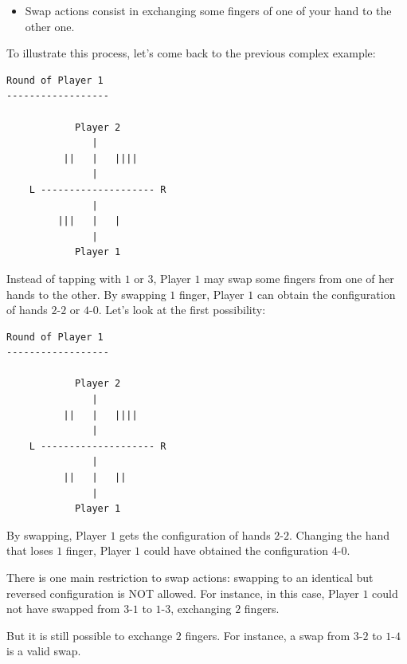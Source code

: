 \documentclass{article}
\begin{document}

\begin{itemize}
    \item Swap actions consist in exchanging some fingers of one of your hand to the other one.
\end{itemize}{}

To illustrate this process, let's come back to the previous complex example:

\begin{verbatim}
Round of Player 1
------------------

            Player 2                
               |                    
          ||   |   ||||             
               |                    
    L -------------------- R        
               |                    
         |||   |   |                
               |                    
            Player 1                

\end{verbatim}{}

Instead of tapping with $1$ or $3$, Player $1$ may swap some fingers from one of her hands to the other. By swapping $1$ finger, Player $1$ can obtain the configuration of hands $2$-$2$ or $4$-$0$. Let's look at the first possibility:

\vspace{2\baselineskip}

\begin{verbatim}
Round of Player 1
------------------

            Player 2                
               |                    
          ||   |   ||||             
               |                    
    L -------------------- R        
               |                    
          ||   |   ||               
               |                    
            Player 1                

\end{verbatim}{}

By swapping, Player $1$ gets the configuration of hands $2$-$2$. Changing the hand that loses $1$ finger, Player $1$ could have obtained the configuration $4$-$0$.

There is one main restriction to swap actions: swapping to an identical but reversed configuration is NOT allowed. For instance, in this case, Player $1$ could not have swapped from $3$-$1$ to $1$-$3$, exchanging $2$ fingers.

But it is still possible to exchange $2$ fingers. For instance, a swap from $3$-$2$ to $1$-$4$ is a valid swap.
\end{document}
